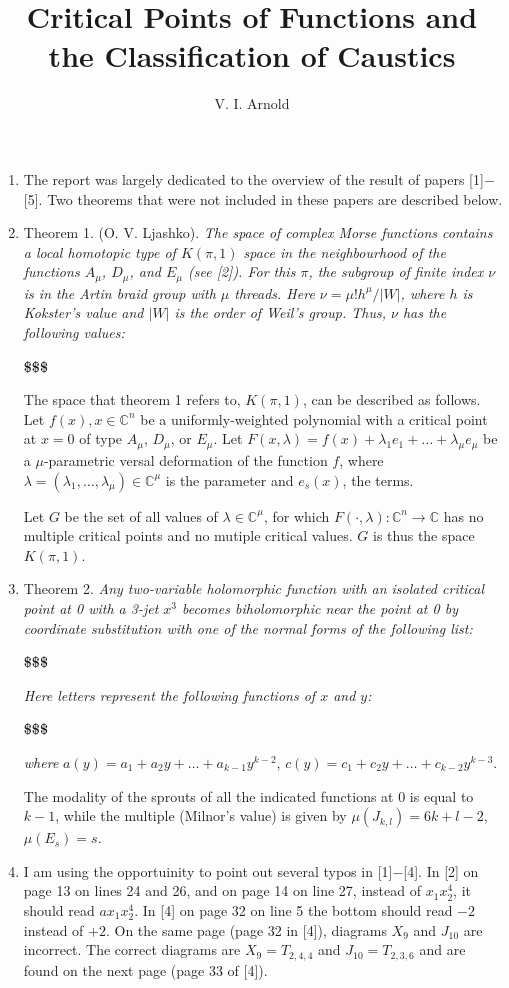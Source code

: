 \documentclass{article}
\renewcommand{\d}{\textbf{\$\$\$}}
\begin{document}
\date{}
\author{V. I. Arnold}
\title{Critical Points of Functions and the Classification of Caustics}
\maketitle
\begin{enumerate}
\item
The report was largely dedicated to the overview of the result of papers
[1]$-$[5].
Two theorems that were not included in these papers are described below.
\item
Theorem 1.
(O. V. Ljashko).
\textit{The space of complex Morse functions contains a local homotopic type of
$K(\pi,1)$ space in the neighbourhood of the functions $A_\mu$, $D_\mu$, and
$E_\mu$ (see [2]).
For this $\pi$, the subgroup of finite index $\nu$ is in the Artin braid group
with $\mu$ threads.
Here $\nu=\mu!h^\mu/|W|$, where $h$ is Kokster's value and $|W|$ is the order of
Weil's group.
Thus, $\nu$ has the following values:}

\d

The space that theorem 1 refers to, $K(\pi,1)$, can be described as follows.
Let $f(x),x\in\mathbb{C}^n$ be a uniformly-weighted polynomial with a critical
point at $x=0$ of type $A_\mu$, $D_\mu$, or $E_\mu$.
Let $F(x,\lambda)=f(x)+\lambda_1e_1+\ldots+\lambda_\mu e_\mu$ be a
$\mu$-parametric versal deformation of the function $f$, where
$\lambda=(\lambda_1,\ldots,\lambda_\mu)\in\mathbb{C}^\mu$ is the parameter and
$e_s(x)$, the terms.

Let $G$ be the set of all values of $\lambda\in\mathbb{C}^\mu$, for which
$F(\cdot,\lambda):\mathbb{C}^n\to\mathbb{C}$ has no multiple critical points and
no mutiple critical values.
$G$ is thus the space $K(\pi,1)$.
\item
Theorem 2.
\textit{Any two-variable holomorphic function with an isolated critical point at
0 with a 3-jet $x^3$ becomes biholomorphic near the point at 0 by coordinate
substitution with one of the normal forms of the following list:}

\d

\textit{Here letters represent the following functions of $x$ and $y$:}

\d

\textit{where }$a(y)=a_1+a_2y+\ldots+a_{k-1}y^{k-2}$, $c(y)=c_1+c_2y+\ldots+c_{k-2}y^{k-3}$.

The modality of the sprouts of all the indicated functions at 0 is equal to
$k-1$, while the multiple (Milnor's value) is given by $\mu(J_{k,l})=6k+l-2$,
$\mu(E_s)=s$.
\item
I am using the opportuinity to point out several typos in [1]$-$[4].
In [2] on page 13 on lines 24 and 26, and on page 14 on line 27, instead of
$x_1x^4_2$, it should read $ax_1x^4_2$.
In [4] on page 32 on line 5 the bottom should read $-2$ instead of $+2$.
On the same page (page 32 in [4]), diagrams $X_9$ and $J_{10}$ are incorrect.
The correct diagrams are $X_9=T_{2,4,4}$ and $J_{10}=T_{2,3,6}$ and are found on
the next page (page 33 of [4]).


\end{enumerate}
\end{document}
